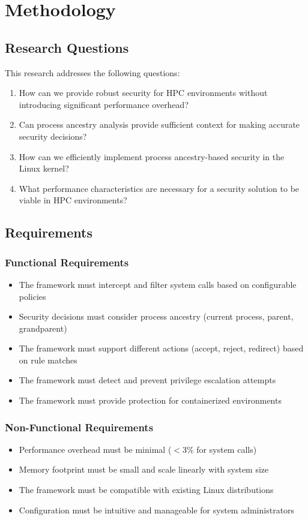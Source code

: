 \section{Methodology}
\label{sec:methodology}

\subsection{Research Questions}
This research addresses the following questions:

\begin{enumerate}
\item How can we provide robust security for HPC environments without introducing significant performance overhead?
\item Can process ancestry analysis provide sufficient context for making accurate security decisions?
\item How can we efficiently implement process ancestry-based security in the Linux kernel?
\item What performance characteristics are necessary for a security solution to be viable in HPC environments?
\end{enumerate}

\subsection{Requirements}

\subsubsection{Functional Requirements}
\begin{itemize}
\item The framework must intercept and filter system calls based on configurable policies
\item Security decisions must consider process ancestry (current process, parent, grandparent)
\item The framework must support different actions (accept, reject, redirect) based on rule matches
\item The framework must detect and prevent privilege escalation attempts
\item The framework must provide protection for containerized environments
\end{itemize}

\subsubsection{Non-Functional Requirements}
\begin{itemize}
\item Performance overhead must be minimal ($<$3\% for system calls)
\item Memory footprint must be small and scale linearly with system size
\item The framework must be compatible with existing Linux distributions
\item Configuration must be intuitive and manageable for system administrators
\end{itemize}

